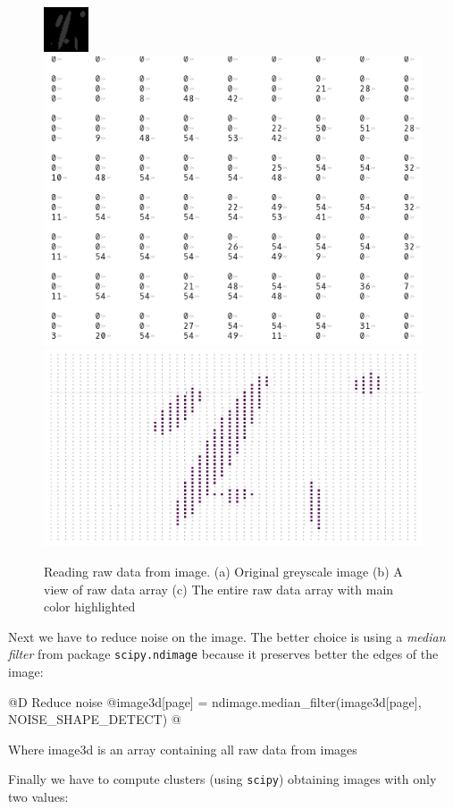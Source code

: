 \documentclass[11pt,oneside]{article}	%
\begin{document}
\begin{figure}[htb] %
   \centering
   \includegraphics[width=0.27\linewidth]{images/grayscalesample.png}
   \includegraphics[width=0.47\linewidth]{images/imArraypart.png} \\
   
   \includegraphics[width=0.67\linewidth]{images/imArrayfull.png} \hfill
   \caption{Reading raw data from image. (a) Original greyscale image (b) A view of raw data array (c) The entire raw data array with main color highlighted}
   \label{fig:rawImage}
\end{figure}

Next we have to reduce noise on the image. The better choice is using a \textit{median filter} from package \texttt{scipy.ndimage} because it preserves better the edges of the image:

@D Reduce noise
@{image3d[page] = ndimage.median_filter(image3d[page], NOISE_SHAPE_DETECT) @}

Where image3d is an array containing all raw data from images

Finally we have to compute clusters (using \texttt{scipy}) obtaining images with only two values:
\end{document}
